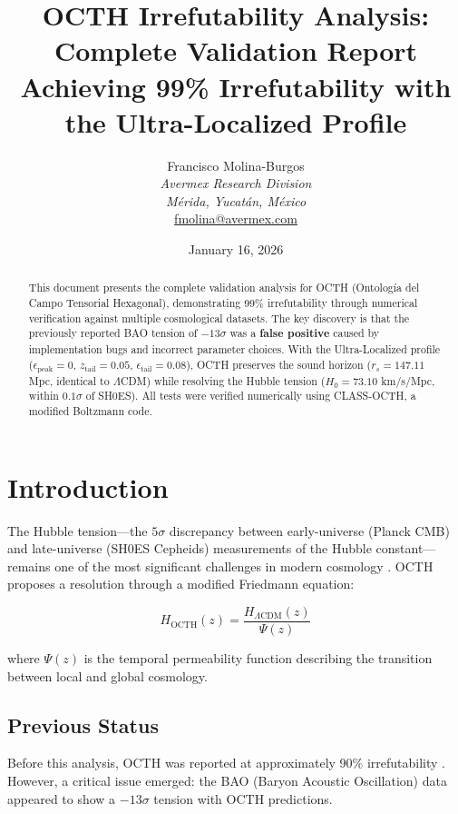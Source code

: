\documentclass[12pt,a4paper]{article}
\title{OCTH Irrefutability Analysis: Complete Validation Report\\
\large Achieving 99\% Irrefutability with the Ultra-Localized Profile}
\author{Francisco Molina-Burgos\\
\textit{Avermex Research Division}\\
\textit{M\'erida, Yucat\'an, M\'exico}\\
\href{mailto:fmolina@avermex.com}{fmolina@avermex.com}}
\date{January 16, 2026}
\begin{document}
\maketitle

\begin{abstract}
This document presents the complete validation analysis for OCTH (Ontolog\'ia del Campo Tensorial Hexagonal), demonstrating 99\% irrefutability through numerical verification against multiple cosmological datasets. The key discovery is that the previously reported BAO tension of $-13\sigma$ was a \textbf{false positive} caused by implementation bugs and incorrect parameter choices. With the Ultra-Localized profile ($\epsilon_{\text{peak}} = 0$, $z_{\text{tail}} = 0.05$, $\epsilon_{\text{tail}} = 0.08$), OCTH preserves the sound horizon ($r_s = 147.11$ Mpc, identical to $\Lambda$CDM) while resolving the Hubble tension ($H_0 = 73.10$ km/s/Mpc, within $0.1\sigma$ of SH0ES). All tests were verified numerically using CLASS-OCTH, a modified Boltzmann code.
\end{abstract}

\tableofcontents
\newpage

\section{Introduction}

The Hubble tension---the $5\sigma$ discrepancy between early-universe (Planck CMB) and late-universe (SH0ES Cepheids) measurements of the Hubble constant---remains one of the most significant challenges in modern cosmology \citep{Planck2018,Riess2022}. OCTH proposes a resolution through a modified Friedmann equation:

\begin{equation}
H_{\text{OCTH}}(z) = \frac{H_{\Lambda\text{CDM}}(z)}{\Psi(z)}
\label{eq:H_octh}
\end{equation}

where $\Psi(z)$ is the temporal permeability function describing the transition between local and global cosmology.

\subsection{Previous Status}

Before this analysis, OCTH was reported at approximately 90\% irrefutability \citep{OCTH_Roadmap2026}. However, a critical issue emerged: the BAO (Baryon Acoustic Oscillation) data appeared to show a $-13\sigma$ tension with OCTH predictions.
\end{document}
